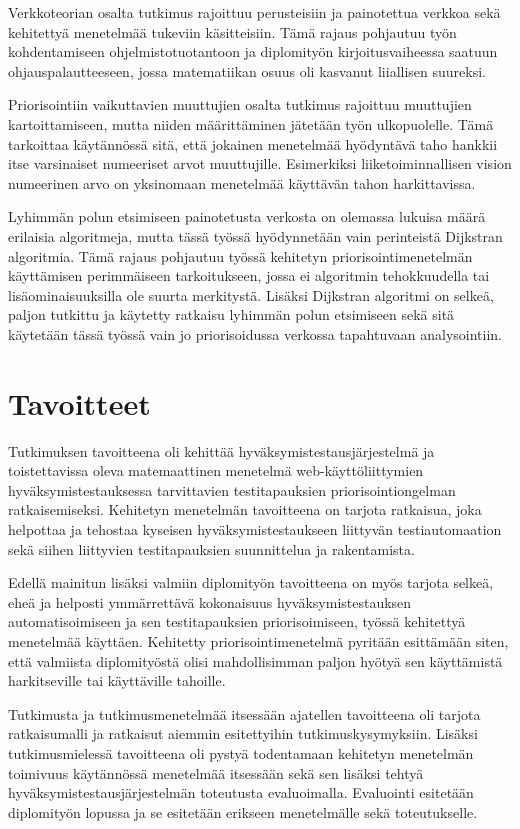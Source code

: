   Verkkoteorian osalta tutkimus rajoittuu perusteisiin ja painotettua verkkoa sekä kehitettyä menetelmää tukeviin käsitteisiin.
  Tämä rajaus pohjautuu työn kohdentamiseen ohjelmistotuotantoon ja diplomityön kirjoitusvaiheessa saatuun ohjauspalautteeseen, jossa matematiikan osuus oli kasvanut liiallisen suureksi.

  Priorisointiin vaikuttavien muuttujien osalta tutkimus rajoittuu muuttujien kartoittamiseen, mutta niiden määrittäminen jätetään työn ulkopuolelle.
  Tämä tarkoittaa käytännössä sitä, että jokainen menetelmää hyödyntävä taho hankkii itse varsinaiset numeeriset arvot muuttujille.
  Esimerkiksi liiketoiminnallisen vision numeerinen arvo on yksinomaan menetelmää käyttävän tahon harkittavissa.

  Lyhimmän polun etsimiseen painotetusta verkosta on olemassa lukuisa määrä erilaisia algoritmeja, mutta tässä työssä hyödynnetään vain perinteistä Dijkstran algoritmia.
  Tämä rajaus pohjautuu työssä kehitetyn priorisointimenetelmän käyttämisen perimmäiseen tarkoitukseen, jossa ei algoritmin tehokkuudella tai lisäominaisuuksilla ole suurta merkitystä.
  Lisäksi Dijkstran algoritmi on selkeä, paljon tutkittu ja käytetty ratkaisu lyhimmän polun etsimiseen sekä sitä käytetään tässä työssä vain jo priorisoidussa verkossa tapahtuvaan analysointiin.

\section{Tavoitteet} \label{ch:06_tavoitteet}

  Tutkimuksen tavoitteena oli kehittää hyväksymistestausjärjestelmä ja toistettavissa oleva matemaattinen menetelmä web-käyttöliittymien hyväksymistestauksessa tarvittavien testitapauksien priorisointiongelman ratkaisemiseksi.
  Kehitetyn menetelmän tavoitteena on tarjota ratkaisua, joka helpottaa ja tehostaa kyseisen hyväksymistestaukseen liittyvän testiautomaation sekä siihen liittyvien testitapauksien suunnittelua ja rakentamista.

  Edellä mainitun lisäksi valmiin diplomityön tavoitteena on myös tarjota selkeä, eheä ja helposti ymmärrettävä kokonaisuus hyväksymistestauksen automatisoimiseen ja sen testitapauksien priorisoimiseen, työssä kehitettyä menetelmää käyttäen.
  Kehitetty priorisointimenetelmä pyritään esittämään siten, että valmiista diplomityöstä olisi mahdollisimman paljon hyötyä sen käyttämistä harkitseville tai käyttäville tahoille.

  Tutkimusta ja tutkimusmenetelmää itsessään ajatellen tavoitteena oli tarjota ratkaisumalli ja ratkaisut aiemmin esitettyihin tutkimuskysymyksiin.
  Lisäksi tutkimusmielessä tavoitteena oli pystyä todentamaan kehitetyn menetelmän toimivuus käytännössä menetelmää itsessään sekä sen lisäksi tehtyä hyväksymistestausjärjestelmän toteutusta evaluoimalla.
  Evaluointi esitetään diplomityön lopussa ja se esitetään erikseen menetelmälle sekä toteutukselle.
